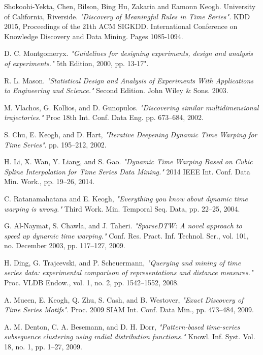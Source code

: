 \begin{thebibliography}{9}
Shokoohi-Yekta, Chen, Bilson, Bing Hu, Zakaria and Eamonn Keogh. University of California, Riverside. \textit{"Discovery of Meaningful Rules in Time Series".} KDD 2015, Proceedings of the 21th ACM SIGKDD. International Conference on Knowledge Discovery and Data Mining. Pages 1085-1094.

D. C. Montgomeryx.
\textit{"Guidelines for designing experiments, design and analysis of experiments."} 5th Edition, 2000, pp. 13-17".

R. L. Mason. \textit{"Statistical Design and Analysis of Experiments With Applications to Engineering and Science."} Second Edition. John Wiley \& Sons. 2003.

M. Vlachos, G. Kollios, and D. Gunopulos. \textit{"Discovering similar multidimensional trajectories."} Proc 18th Int. Conf. Data Eng. pp. 673–684, 2002.

S. Chu, E. Keogh, and D. Hart, \textit{"Iterative Deepening Dynamic Time Warping for Time Series"}. pp. 195–212, 2002.

H. Li, X. Wan, Y. Liang, and S. Gao. \textit{"Dynamic Time Warping Based on Cubic Spline Interpolation for Time Series Data Mining."} 2014 IEEE Int. Conf. Data Min. Work., pp. 19–26, 2014.

C. Ratanamahatana and E. Keogh, \textit{"Everything you know about dynamic time warping is wrong."} Third Work. Min. Temporal Seq. Data, pp. 22–25, 2004.

G. Al-Naymat, S. Chawla, and J. Taheri. \textit{"SparseDTW: A novel approach to speed up dynamic time warping."} Conf. Res. Pract. Inf. Technol. Ser., vol. 101, no. December 2003, pp. 117–127, 2009.

H. Ding, G. Trajcevski, and P. Scheuermann, \textit{"Querying and mining of time series data: experimental comparison of representations and distance measures."} Proc. VLDB Endow., vol. 1, no. 2, pp. 1542–1552, 2008.

A. Mueen, E. Keogh, Q. Zhu, S. Cash, and B. Westover, \textit{"Exact Discovery of Time Series Motifs"}. Proc. 2009 SIAM Int. Conf. Data Min., pp. 473–484, 2009.

A. M. Denton, C. A. Besemann, and D. H. Dorr, \textit{"Pattern-based time-series subsequence clustering using radial distribution functions."} Knowl. Inf. Syst. Vol. 18, no. 1, pp. 1–27, 2009.


\end{thebibliography}
